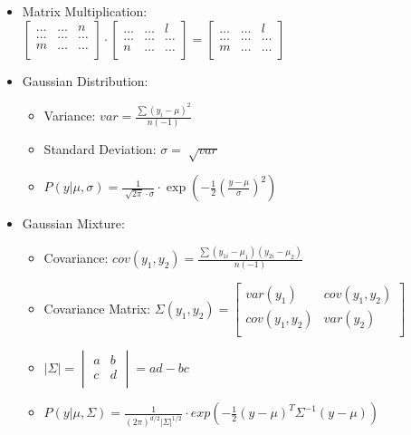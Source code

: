 \documentclass[twocolumn, 10pt]{article}
\begin{document}
\begin{itemize}[leftmargin=*, itemsep=0pt]
    \item Matrix Multiplication: \\[3pt]
    $\begin{bmatrix}
        \ldots & \ldots & n \\
        \ldots & \ldots & \ldots \\
        m & \ldots & \ldots \\
    \end{bmatrix} \cdot
    \begin{bmatrix}
        \ldots & \ldots & l \\
        \ldots & \ldots & \ldots \\
        n & \ldots & \ldots \\
    \end{bmatrix} =
    \begin{bmatrix}
        \ldots & \ldots & l \\
        \ldots & \ldots & \ldots \\
        m & \ldots & \ldots \\
    \end{bmatrix}$

    \newpage
    \item Gaussian Distribution:
    \begin{itemize}[topsep=0pt]
        \item Variance: $\displaystyle var=\frac{\sum(y_i-\mu)^2}{n(-1)}$
        \item Standard Deviation: $\displaystyle \sigma=\sqrt[]{var}$
        \item $\displaystyle  P(y|\mu,\sigma)=\frac{1}{\sqrt[]{2\pi}\cdot\sigma}\cdot\exp\left(-\frac{1}{2}\left(\frac{y-\mu}{\sigma}\right)^2\right)$
    \end{itemize}

    \item Gaussian Mixture:
    \begin{itemize}[topsep=0pt]
        \item Covariance: $\displaystyle cov(y_1,y_2)=\frac{\sum(y_{1i}-\mu_1)(y_{2i}-\mu_2)}{n(-1)}$
        \item Covariance Matrix: $\Sigma(y_1,y_2)=
        \begin{bmatrix}
            var(y_1) & cov(y_1,y_2) \\
            cov(y_1,y_2) & var(y_2) \\
        \end{bmatrix}$
        \item $\left\lvert\Sigma\right\rvert=
        \begin{vmatrix}
            a & b \\
            c & d \\
        \end{vmatrix}
        = ad-bc$
        \item $\displaystyle P(y|\mu,\Sigma)=\frac{1}{(2\pi)^{d/2}|\Sigma|^{1/2}}\cdot exp\left(-\frac{1}{2}(y-\mu)^T\Sigma^{-1}(y-\mu)\right)$
    \end{itemize}


\end{itemize}
\end{document}
